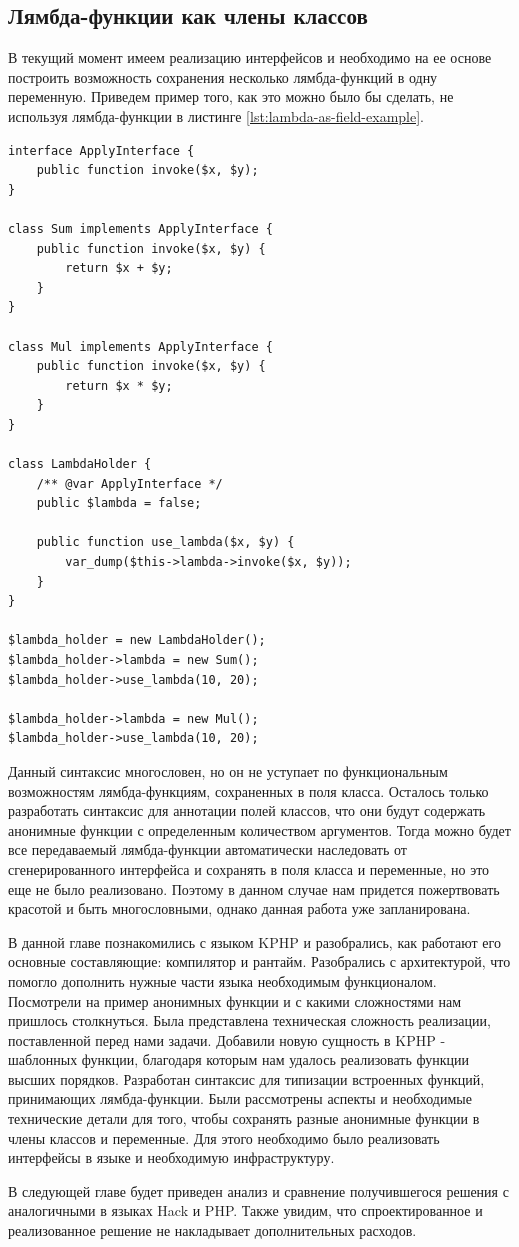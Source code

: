 \subsection{Лямбда-функции как члены классов}
В текущий момент имеем реализацию интерфейсов и необходимо на ее основе построить возможность сохранения несколько лямбда-функций в одну переменную.
Приведем пример того, как это можно было бы сделать, не используя лямбда-функции в листинге \ref{lst:lambda-as-field-example}.
\begin{lstlisting}[caption={Пример замены сохранения лямбда-функции в поле класса},label={lst:lambda-as-field-example}]
interface ApplyInterface {
    public function invoke($x, $y);
}

class Sum implements ApplyInterface {
    public function invoke($x, $y) {
        return $x + $y;
    }
}

class Mul implements ApplyInterface {
    public function invoke($x, $y) {
        return $x * $y;
    }
}

class LambdaHolder {
    /** @var ApplyInterface */
    public $lambda = false;

    public function use_lambda($x, $y) {
        var_dump($this->lambda->invoke($x, $y));
    }
}

$lambda_holder = new LambdaHolder();
$lambda_holder->lambda = new Sum();
$lambda_holder->use_lambda(10, 20);

$lambda_holder->lambda = new Mul();
$lambda_holder->use_lambda(10, 20);
\end{lstlisting}

Данный синтаксис многословен, но он не уступает по функциональным возможностям лямбда-функциям, сохраненных в поля класса.
Осталось только разработать синтаксис для аннотации полей классов, что они будут содержать анонимные функции с определенным количеством аргументов.
Тогда можно будет все передаваемый лямбда-функции автоматически наследовать от сгенерированного интерфейса и сохранять в поля класса и переменные, но это еще не было реализовано.
Поэтому в данном случае нам придется пожертвовать красотой и быть многословными, однако данная работа уже запланирована.

\chapterconclusion
В данной главе познакомились с языком KPHP и разобрались, как работают его основные составляющие: компилятор и рантайм.
Разобрались с архитектурой, что помогло дополнить нужные части языка необходимым функционалом.
Посмотрели на пример анонимных функции и с какими сложностями нам пришлось столкнуться.
Была представлена техническая сложность реализации, поставленной перед нами задачи.
Добавили новую сущность в KPHP - шаблонных функции, благодаря которым нам удалось реализовать функции высших порядков.
Разработан синтаксис для типизации встроенных функций, принимающих лямбда-функции.
Были рассмотрены аспекты и необходимые технические детали для того, чтобы сохранять разные анонимные функции в члены классов и переменные.
Для этого необходимо было реализовать интерфейсы в языке и необходимую инфраструктуру.

В следующей главе будет приведен анализ и сравнение получившегося решения с аналогичными в языках Hack и PHP.
Также увидим, что спроектированное и реализованное решение не накладывает дополнительных расходов.
